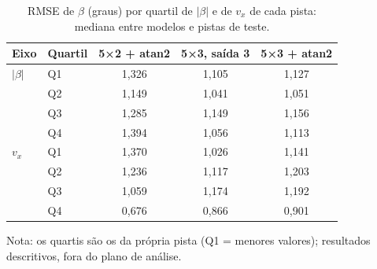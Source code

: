 \begin{table}[htbp]
    \centering
    \caption{RMSE de $\beta$ (graus) por quartil de $|\beta|$ e de $v_x$ de cada pista: mediana entre modelos e pistas de teste.}
    \label{tab:regime}
    \small
    \begin{tabular}{llccc}
        \toprule
        \textbf{Eixo} & \textbf{Quartil} & \textbf{5×2 + atan2} & \textbf{5×3, saída 3} & \textbf{5×3 + atan2} \\
        \midrule
        $|\beta|$ & Q1 & 1,326 & 1,105 & 1,127 \\
         & Q2 & 1,149 & 1,041 & 1,051 \\
         & Q3 & 1,285 & 1,149 & 1,156 \\
         & Q4 & 1,394 & 1,056 & 1,113 \\
        $v_x$ & Q1 & 1,370 & 1,026 & 1,141 \\
         & Q2 & 1,236 & 1,117 & 1,203 \\
         & Q3 & 1,059 & 1,174 & 1,192 \\
         & Q4 & 0,676 & 0,866 & 0,901 \\
        \bottomrule
    \end{tabular}
    \par\footnotesize Nota: os quartis são os da própria pista (Q1 = menores valores); resultados descritivos, fora do plano de análise.
\end{table}
